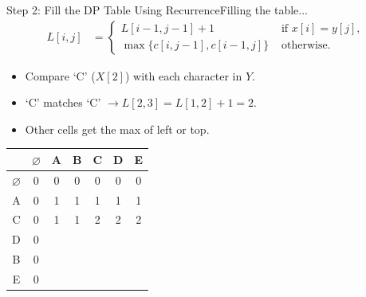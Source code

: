 \documentclass{beamer}
\begin{document}
\begin{frame}{Step 2: Fill the DP Table Using Recurrence}{Filling the table...}
    \vspace{-10mm}
    \scriptsize
    \begin{equation*}
        \begin{align*}
            L[i, j] &=
                        \begin{cases}
                            L[i - 1, j - 1] + 1 & \text{ if } x[i] = y[j] \text{, } \\
                            \max \{ c[i, j - 1], c[i - 1, j] \} & \text{ otherwise.}
                        \end{cases}
        \end{align*}
    \end{equation*}
    \begin{itemize}
        \item Compare `C' ($X[2]$) with each character in $Y$.
        \item `C' matches `C' $\longrightarrow L[2,3] = L[1,2] + 1 = 2$.
        \item Other cells get the max of left or top.
    \end{itemize}
    \vspace{6mm}
    \normalsize
    \centering
    \begin{tabular}{|c|c|c|c|c|c|c|} \hline
                      & $\varnothing$ & A & B & C & D & E \\ \hline
        $\varnothing$ &        0      & 0 & 0 & 0 & 0 & 0 \\ \hline
               A      &        0      & 1 & 1 & 1 & 1 & 1 \\ \hline
               C      &        0      & 1 & 1 & 2 & 2 & 2 \\ \hline
               D      &        0      &   &   &   &   &   \\ \hline
               B      &        0      &   &   &   &   &   \\ \hline
               E      &        0      &   &   &   &   &   \\ \hline
    \end{tabular}
\end{frame}
\end{document}
